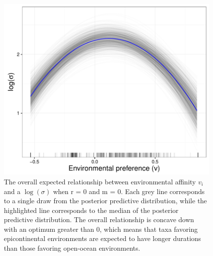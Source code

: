 \documentclass{article}
\begin{document}
\begin{figure}[ht]
  \centering
  \includegraphics[height = 0.5\textheight,width=\textwidth,keepaspectratio=true]{figure/env_effect}
  \caption{The overall expected relationship between environmental affinity \(v_{i}\) and a \(\log(\sigma)\) when r = 0 and m = 0. Each grey line corresponds to a single draw from the posterior predictive distribution, while the highlighted line corresponds to the median of the posterior predictive distribution. The overall relationship is concave down with an optimum greater than 0, which means that taxa favoring epicontinental environments are expected to have longer durations than those favoring open-ocean environments.}
  \label{fig:env_mean}
\end{figure}
\end{document}

